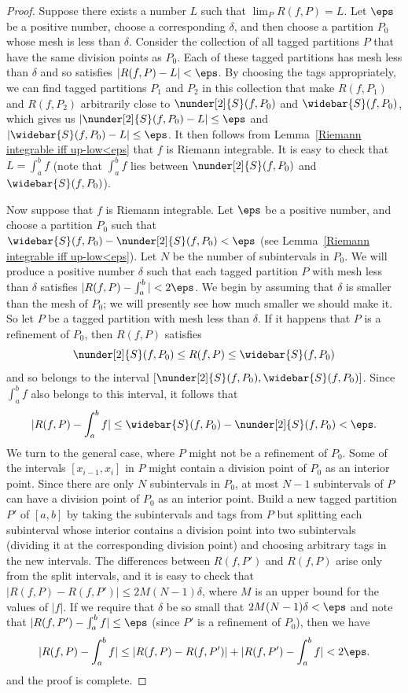 \begin{proof}
Suppose there exists a number $L$ such that $\lim_PR(f,P)=L$. Let $\eps$ be a positive number, choose a corresponding $\delta$, and then choose a partition $P_0$ whose mesh is less than $\delta$. Consider the collection of all tagged partitions $P$ that have the same division points as $P_0$. Each of these tagged partitions has mesh less than $\delta$ and so satisfies $|R(f,P)-L|<\eps$. By choosing the tags appropriately, we can find tagged partitions $P_1$ and $P_2$ in this collection that make $R(f,P_1)$ and $R(f,P_2)$ arbitrarily close to $\nunder[2]{S}(f,P_0)$ and $\widebar{S}(f,P_0)$, which gives us $|\nunder[2]{S}(f,P_0)-L|\leq\eps$ and $|\widebar{S}(f,P_0)-L|\leq\eps$. It then follows from Lemma~\ref{Riemann integrable iff up-low<eps} that $f$ is Riemann integrable. It is easy to check that $L=\int_{a}^{b}f$ (note that $\int_a^bf$ lies between $\nunder[2]{S}(f,P_0)$ and $\widebar{S}(f,P_0)$).\par
Now suppose that $f$ is Riemann integrable. Let $\eps$ be a positive number, and choose a partition $P_0$ such that $\widebar{S}(f,P_0)-\nunder[2]{S}(f,P_0)<\eps$ (see Lemma~\ref{Riemann integrable iff up-low<eps}). Let $N$ be the number of subintervals in $P_0$. We will produce a positive number $\delta$ such that each tagged partition $P$ with mesh less than $\delta$ satisfies $|R(f,P)-\int_a^b|<2\eps$. We begin by assuming that $\delta$ is smaller than the mesh of $P_0$; we will presently see how much smaller we should make it. So let $P$ be a tagged partition with mesh less than $\delta$. If it happens that $P$ is a refinement of $P_0$, then $R(f,P)$ satisfies
\[\nunder[2]{S}(f,P_0)\leq R(f,P)\leq\widebar{S}(f,P_0)\]
and so belongs to the interval $[\nunder[2]{S}(f,P_0),\widebar{S}(f,P_0)]$. Since $\int_a^bf$ also belongs to this interval, it follows that
\[|R(f,P)-\int_a^bf|\leq\widebar{S}(f,P_0)-\nunder[2]{S}(f,P_0)<\eps.\]
We turn to the general case, where $P$ might not be a refinement of $P_0$. Some of the intervals $[x_{i-1},x_i]$ in $P$ might contain a division point of $P_0$ as an interior point. Since there are only $N$ subintervals in $P_0$, at most $N-1$ subintervals of $P$ can have a division point of $P_0$ as an interior point. Build a new tagged partition $P'$ of $[a,b]$ by taking the subintervals and tags from $P$ but splitting each subinterval whose interior contains a division point into two subintervals (dividing it at the corresponding division point) and choosing arbitrary tags in the new intervals. The differences between $R(f,P')$ and $R(f,P)$ arise only from the split intervals, and it is easy to check that $|R(f,P)-R(f,P')|\leq 2M(N-1)\delta$, where $M$ is an upper bound for the values of $|f|$. If we require that $\delta$ be so small that $2M(N-1)\delta<\eps$ and note that $|R(f,P')-\int_a^bf|\leq\eps$ (since $P'$ is a refinement of $P_0$), then we have
\[|R(f,P)-\int_{a}^bf|\leq|R(f,P)-R(f,P')|+|R(f,P')-\int_a^bf|<2\eps.\]
and the proof is complete.
\end{proof}
